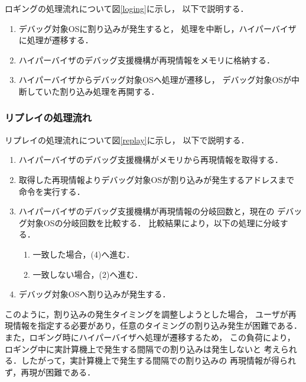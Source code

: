 \documentclass[submit,techreq,noauthor,dvipdfmx]{ipsj}
\begin{document}

ロギングの処理流れについて図\ref{loging}に示し，
以下で説明する．

\begin{enumerate}
    \item 
        デバッグ対象OSに割り込みが発生すると，
        処理を中断し，ハイパーバイザに処理が遷移する．
    \item 
        ハイパーバイザのデバッグ支援機構が再現情報をメモリに格納する．
    \item 
        ハイパーバイザからデバッグ対象OSへ処理が遷移し，
        デバッグ対象OSが中断していた割り込み処理を再開する．
\end{enumerate}

\subsubsection{リプレイの処理流れ}


リプレイの処理流れについて図\ref{replay}に示し，
以下で説明する．
\begin{enumerate}
    \item 
        ハイパーバイザのデバッグ支援機構がメモリから再現情報を取得する．
    \item 
        取得した再現情報よりデバッグ対象OSが割り込みが発生するアドレスまで
        命令を実行する．
    \item 
        ハイパーバイザのデバッグ支援機構が再現情報の分岐回数と，現在の
        デバッグ対象OSの分岐回数を比較する．
        比較結果により，以下の処理に分岐する．
        \begin{enumerate}
            \item 一致した場合，(4)へ進む．
            \item 一致しない場合，(2)へ進む．
        \end{enumerate}
    \item 
        デバッグ対象OSへ割り込みが発生する．
\end{enumerate}

このように，割り込みの発生タイミングを調整しようとした場合，
ユーザが再現情報を指定する必要があり，任意のタイミングの割り込み発生が困難である．
また，ロギング時にハイパーバイザへ処理が遷移するため，
この負荷により，ロギング中に実計算機上で発生する間隔での割り込みは発生しないと
考えられる．したがって，実計算機上で発生する間隔での割り込みの
再現情報が得られず，再現が困難である．
\end{document}
